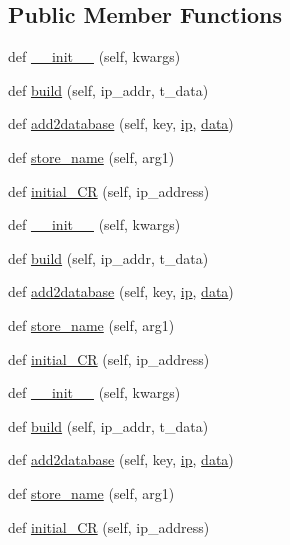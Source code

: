 \subsection*{Public Member Functions}
\begin{DoxyCompactItemize}
\item 
def \hyperlink{classTestingGUI_1_1addingLight_ace8a7edfba84662f465ad3b6cc979ba0}{\+\_\+\+\_\+init\+\_\+\+\_\+} (self, kwargs)
\item 
def \hyperlink{classTestingGUI_1_1addingLight_a09539dcb1cdfd504a9e75937bf380284}{build} (self, ip\+\_\+addr, t\+\_\+data)
\item 
def \hyperlink{classTestingGUI_1_1addingLight_a4ce96f3dc2a6a06664d0c3b724dc5e8a}{add2database} (self, key, \hyperlink{classTestingGUI_1_1addingLight_afc65af761152e3325cc2cc225c9e8f7d}{ip}, \hyperlink{classTestingGUI_1_1addingLight_a763aa941465f77b12ffea9edba79c399}{data})
\item 
def \hyperlink{classTestingGUI_1_1addingLight_adec18b9e79375b11c280acdd672ea15a}{store\+\_\+name} (self, arg1)
\item 
def \hyperlink{classTestingGUI_1_1addingLight_a5804dc70f75e50f75694b529206dabf7}{initial\+\_\+\+CR} (self, ip\+\_\+address)
\item 
def \hyperlink{classTestingGUI_1_1addingLight_ace8a7edfba84662f465ad3b6cc979ba0}{\+\_\+\+\_\+init\+\_\+\+\_\+} (self, kwargs)
\item 
def \hyperlink{classTestingGUI_1_1addingLight_a09539dcb1cdfd504a9e75937bf380284}{build} (self, ip\+\_\+addr, t\+\_\+data)
\item 
def \hyperlink{classTestingGUI_1_1addingLight_a4ce96f3dc2a6a06664d0c3b724dc5e8a}{add2database} (self, key, \hyperlink{classTestingGUI_1_1addingLight_afc65af761152e3325cc2cc225c9e8f7d}{ip}, \hyperlink{classTestingGUI_1_1addingLight_a763aa941465f77b12ffea9edba79c399}{data})
\item 
def \hyperlink{classTestingGUI_1_1addingLight_adec18b9e79375b11c280acdd672ea15a}{store\+\_\+name} (self, arg1)
\item 
def \hyperlink{classTestingGUI_1_1addingLight_a5804dc70f75e50f75694b529206dabf7}{initial\+\_\+\+CR} (self, ip\+\_\+address)
\item 
def \hyperlink{classTestingGUI_1_1addingLight_ace8a7edfba84662f465ad3b6cc979ba0}{\+\_\+\+\_\+init\+\_\+\+\_\+} (self, kwargs)
\item 
def \hyperlink{classTestingGUI_1_1addingLight_a09539dcb1cdfd504a9e75937bf380284}{build} (self, ip\+\_\+addr, t\+\_\+data)
\item 
def \hyperlink{classTestingGUI_1_1addingLight_a4ce96f3dc2a6a06664d0c3b724dc5e8a}{add2database} (self, key, \hyperlink{classTestingGUI_1_1addingLight_afc65af761152e3325cc2cc225c9e8f7d}{ip}, \hyperlink{classTestingGUI_1_1addingLight_a763aa941465f77b12ffea9edba79c399}{data})
\item 
def \hyperlink{classTestingGUI_1_1addingLight_adec18b9e79375b11c280acdd672ea15a}{store\+\_\+name} (self, arg1)
\item 
def \hyperlink{classTestingGUI_1_1addingLight_a5804dc70f75e50f75694b529206dabf7}{initial\+\_\+\+CR} (self, ip\+\_\+address)
\end{DoxyCompactItemize}
